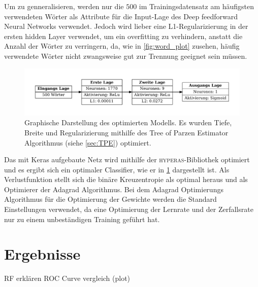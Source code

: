 Um zu genneralisieren, werden nur die $500$ im Trainingsdatensatz am häufigsten verwendeten Wörter als Attribute 
für die Input-Lage des Deep feedforward Neural Networks verwendet. 
Jedoch wird lieber eine L1-Regularizierung in der ersten hidden Layer verwendet, um ein overfitting zu verhindern, 
anstatt die Anzahl der Wörter zu verringern, da, wie in \ref{fig:word_plot} zusehen, häufig verwendete Wörter nicht 
zwangsweise gut zur Trennung geeignet sein müssen.

\begin{figure}
    \centering
    \includegraphics[width=\textwidth]{pictures/modell_scheme.pdf}
    \caption{Graphische Darstellung des optimierten Modells. Es wurden Tiefe, Breite und Regularizierung mithilfe 
            des Tree of Parzen Estimator Algorithmus (siehe \ref{sec:TPE}) optimiert.}
    \label{fig:NN_structure}
\end{figure}

Das mit Keras\cite{keras} aufgebaute Netz wird mithilfe der \textsc{hyperas}-Bibliothek\cite{hyperas} optimiert und 
es ergibt sich ein optimaler Classifier, wie er in \ref{fig:NN_structure} dargestellt ist.
Als Verlustfunktion stellt sich die binäre Kreuzentropie als optimal heraus und als Optimierer der Adagrad Algorithmus.
Bei dem Adagrad Optimierungs Algorithmus für die Optimierung der Gewichte werden die Standard Einstellungen verwendet, 
da eine Optimierung der Lernrate und der Zerfallsrate nur zu einem unbeständigen Training geführt hat.


\chapter{Ergebnisse}
RF erklären 
ROC Curve vergleich (plot)

